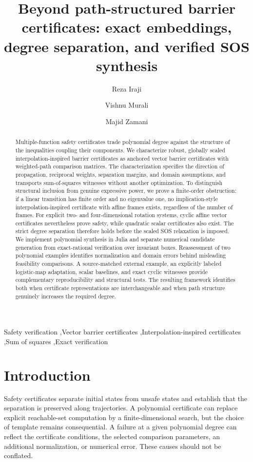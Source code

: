 \documentclass[5p,times]{elsarticle}
\theoremstyle{definition}\newtheorem{definition}[theorem]{Definition}
\theoremstyle{remark}\newtheorem{remark}[theorem]{Remark}
\begin{document}
\begin{frontmatter}
\title{Beyond path-structured barrier certificates: exact embeddings, degree separation, and verified SOS synthesis}
\author[cub]{Reza Iraji}
\author[cub]{Vishnu Murali}
\author[cub]{Majid Zamani}
\address[cub]{Department of Computer Science, University of Colorado Boulder, USA}
\begin{abstract}
Multiple-function safety certificates trade polynomial degree against the structure of the inequalities coupling their components. We characterize robust, globally scaled interpolation-inspired barrier certificates as anchored vector barrier certificates with weighted-path comparison matrices. The characterization specifies the direction of propagation, reciprocal weights, separation margins, and domain assumptions, and transports sum-of-squares witnesses without another optimization. To distinguish structural inclusion from genuine expressive power, we prove a finite-order obstruction: if a linear transition has finite order and no eigenvalue one, no implication-style interpolation-inspired certificate with affine frames exists, regardless of the number of frames. For explicit two- and four-dimensional rotation systems, cyclic affine vector certificates nevertheless prove safety, while quadratic scalar certificates also exist. The strict degree separation therefore holds before the scaled SOS relaxation is imposed. We implement polynomial synthesis in Julia and separate numerical candidate generation from exact-rational verification over invariant boxes. Reassessment of two polynomial examples identifies normalization and domain errors behind misleading feasibility comparisons. A source-matched external example, an explicitly labeled logistic-map adaptation, scalar baselines, and exact cyclic witnesses provide complementary reproducibility and structural tests. The resulting framework identifies both when certificate representations are interchangeable and when path structure genuinely increases the required degree.
\end{abstract}
\begin{keyword}
Safety verification \sep Vector barrier certificates \sep Interpolation-inspired certificates \sep Sum of squares \sep Exact verification
\end{keyword}
\end{frontmatter}

\section{Introduction}
Safety certificates separate initial states from unsafe states and establish that the separation is preserved along trajectories. A polynomial certificate can replace explicit reachable-set computation by a finite-dimensional search, but the choice of template remains consequential. A failure at a given polynomial degree can reflect the certificate conditions, the selected comparison parameters, an additional normalization, or numerical error. These causes should not be conflated.
\end{document}
